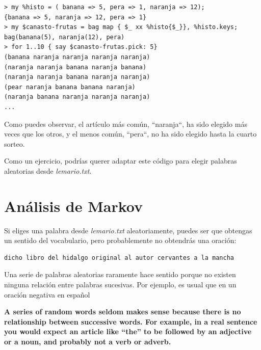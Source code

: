 \begin{verbatim}
> my %histo = ( banana => 5, pera => 1, naranja => 12);
{banana => 5, naranja => 12, pera => 1}
> my $canasto-frutas = bag map { $_ xx %histo{$_}}, %histo.keys;
bag(banana(5), naranja(12), pera)
> for 1..10 { say $canasto-frutas.pick: 5}
(banana naranja naranja naranja naranja)
(naranja naranja banana naranja banana)
(naranja naranja banana naranja naranja)
(pear naranja banana banana naranja)
(naranja banana naranja naranja naranja)
...
\end{verbatim}

Como puedes observar, el artículo más común, ``naranja``, ha sido
elegido más veces que los otros, y el menos común, ``pera``, 
no ha sido elegido hasta la cuarto sorteo.

Como un ejercicio, podrías querer adaptar este código para elegir
palabras aleatorias desde \emph{lemario.txt}.



\section{Análisis de Markov}
\label{markov}

Si eliges una palabra desde \emph{lemario.txt} aleatoriamente,
puedes ser que obtengas un sentido del vocabulario, pero 
probablemente no obtendrás una oración:

\begin{verbatim}
dicho libro del hidalgo original al autor cervantes a la mancha
\end{verbatim}
%
Una serie de palabras aleatorias raramente hace sentido porque 
no existen ninguna relación entre palabras sucesivas. Por ejemplo, 
es usual que en un oración negativa en español 

{\bf A series of random words seldom makes sense because there
is no relationship between successive words.  For example, in
a real sentence you would expect an article like ``the'' to
be followed by an adjective or a noun, and probably not a verb
or adverb.}

